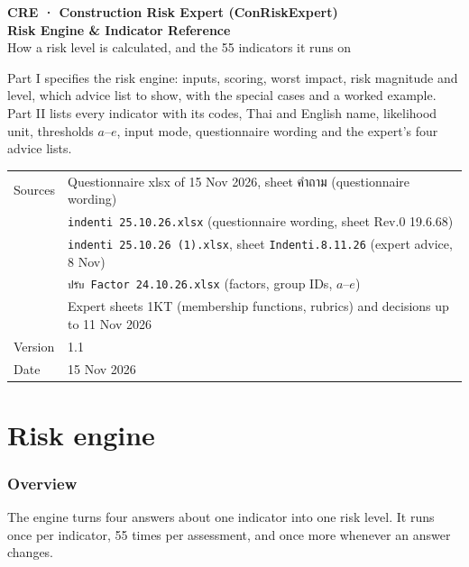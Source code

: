 \documentclass[10pt,a4paper]{article}
\begin{document}
\begin{titlepage}
\vspace*{3cm}
{\color{accent}\large\bfseries CRE · Construction Risk Expert (ConRiskExpert)}\\[0.6em]
{\Huge\bfseries Risk Engine \& Indicator Reference}\\[0.4em]
{\Large How a risk level is calculated, and the 55 indicators it runs on}\\[2em]
{\color{muted}
Part I specifies the risk engine: inputs, scoring, worst impact, risk magnitude and level, which advice list to show, with the special cases and a worked example. Part II lists every indicator with its codes, Thai and English name, likelihood unit, thresholds $a$--$e$, input mode, questionnaire wording and the expert's four advice lists.\\[2em]
\begin{tabular}{@{}ll@{}}
Sources & Questionnaire xlsx of 15 Nov 2026, sheet คำถาม (questionnaire wording)\\
 & \texttt{indenti 25.10.26.xlsx} (questionnaire wording, sheet Rev.0 19.6.68)\\
 & \texttt{indenti 25.10.26 (1).xlsx}, sheet \texttt{Indenti.8.11.26} (expert advice, 8 Nov)\\
 & \texttt{ปรับ Factor 24.10.26.xlsx} (factors, group IDs, $a$--$e$)\\
 & Expert sheets 1KT (membership functions, rubrics) and decisions up to 11 Nov 2026\\
Version & 1.1\\
Date & 15 Nov 2026\\
\end{tabular}}
\vfill
\end{titlepage}
\tableofcontents
\newpage

\clearpage\part{Risk engine}

\section{Overview}
The engine turns four answers about one indicator into one risk level. It runs once per indicator, 55 times per assessment, and once more whenever an answer changes.
\end{document}
